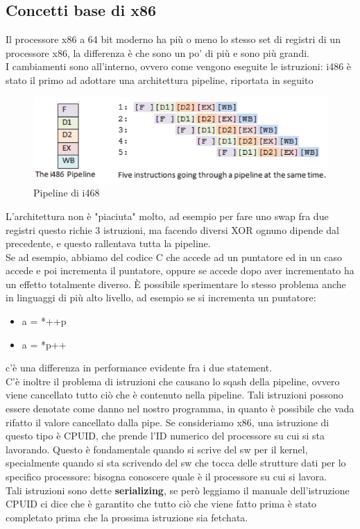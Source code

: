 \documentclass[14pt]{article}
\begin{document}
\subsection{Concetti base di x86}
Il processore x86 a 64 bit moderno ha più o meno lo stesso set di registri di un processore x86, la differenza è che sono un po' di più e sono più grandi.\\ I cambiamenti sono all'interno, ovvero come vengono eseguite le istruzioni: i486 è stato il primo ad adottare una architettura pipeline, riportata in seguito
\begin{figure}[ht!]
\includegraphics[scale=0.4]{immagini/pipeline-i486}
\caption{Pipeline di i468}
\end{figure}
L'architettura non è "piaciuta" molto, ad esempio per fare uno swap fra due registri questo richie 3 istruzioni, ma facendo diversi XOR ognuno dipende dal precedente, e questo rallentava tutta la pipeline.\\ Se ad esempio, abbiamo del codice C che accede ad un puntatore ed in un caso accede e poi incrementa il puntatore, oppure se accede dopo aver incrementato ha un effetto totalmente diverso. È possibile sperimentare lo stesso problema anche in linguaggi di più alto livello, ad esempio se si incrementa un puntatore:
\begin{itemize}
\item a = *++p
\item a = *p++
\end{itemize}
c'è una differenza in performance evidente fra i due statement.\\ C'è inoltre il problema di istruzioni che causano lo sqash della pipeline, ovvero viene cancellato tutto ciò che è contenuto nella pipeline. Tali istruzioni possono essere denotate come danno nel nostro programma, in quanto è possibile che vada rifatto il valore cancellato dalla pipe. Se consideriamo x86, una istruzione di questo tipo è \textsf{CPUID}, che prende l'ID numerico del processore su cui si sta lavorando. Questo è fondamentale quando si scrive del sw per il kernel, specialmente quando si sta scrivendo del sw che tocca delle strutture dati per lo specifico processore: bisogna conoscere quale è il processore su cui si lavora.\\ Tali istruzioni sono dette \textbf{serializing}, se però leggiamo il manuale dell'istruzione CPUID ci dice che è garantito che tutto ciò che viene fatto prima è stato completato prima che la prossima istruzione sia fetchata.
\end{document}
